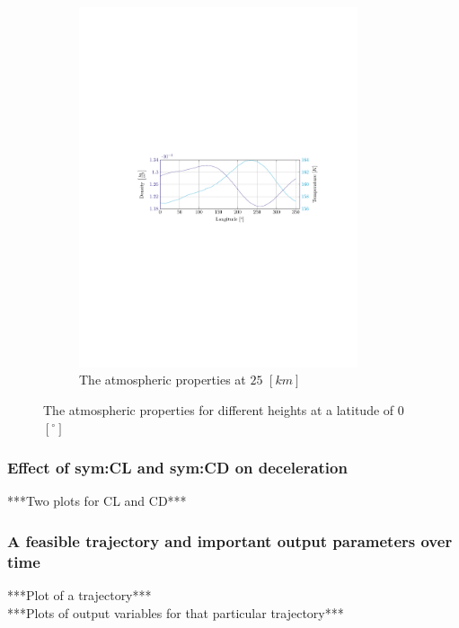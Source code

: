 \begin{figure}[h]
\begin{subfigure}{0.9\textwidth}
	\includegraphics[trim={4.5cm 11cm 3.1cm 11cm},clip,width=0.9\textwidth]{Figure/atmos_model/lon_25.pdf}
	\caption{The atmospheric properties at $25$ $\left[km\right]$} 
	\label{fig:atmos_lon_25}
	\end{subfigure}
	\caption{The atmospheric properties for different heights at a latitude of 0 $\left[^\circ\right]$}
	\label{fig:atmos_lon}
\end{figure}

\subsubsection{Effect of \gls{sym:CL} and \gls{sym:CD} on deceleration}
\label{sec:astrodec}
***Two plots for CL and CD***\\

\subsubsection{A feasible trajectory and important output parameters over time}
\label{sec:astrorestraj}
***Plot of a trajectory***\\
***Plots of output variables for that particular trajectory***\\

